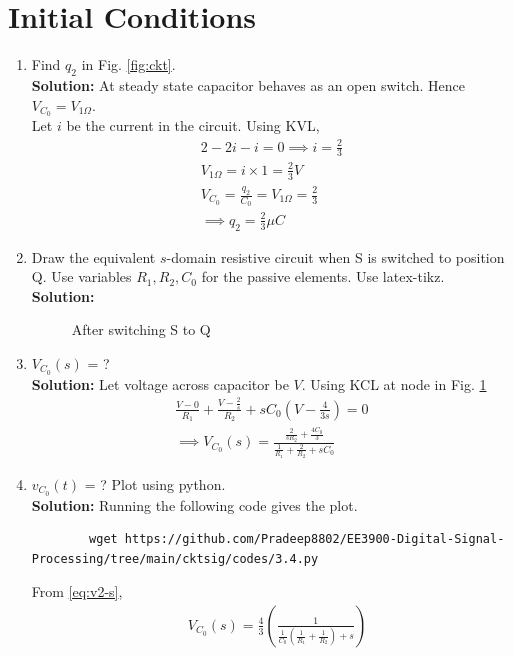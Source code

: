 \documentclass[journal,12pt,twocolumn]{IEEEtran}
\newcommand{\solution}{\noindent \textbf{Solution: }}
\providecommand{\brak}[1]{\ensuremath{\left(#1\right)}}
\numberwithin{equation}{section}
\renewcommand\thesection{\arabic{section}}
\begin{document}
 \section{Initial Conditions}
\begin{enumerate}[label=\arabic*.,ref=\thesection.\theenumi]
\item Find $q_2$ in Fig. \ref{fig:ckt}.\\
			\solution At steady state capacitor behaves as an open switch. Hence $V_{C_0}=V_{1 \Omega}$.\\
			Let $i$ be the current in the circuit. Using KVL,
			\begin{align}
				2-2i-i=0 \implies i=\frac{2}{3}\\
				V_{1 \Omega}=i \times 1= \frac{2}{3} V\\
			V_{C_0}=\frac{q_2}{C_0}=V_{1 \Omega}=\frac{2}{3}\\
			\implies q_2=\frac{2}{3} \mu C
			\end{align}
\item Draw the equivalent $s$-domain resistive circuit when S is switched to position Q.  Use variables $R_1, R_2, C_0$ for the passive elements.
Use latex-tikz.
		\label{prob:init}
		\\\solution 
	\begin{figure}[!ht]
 \centering

\caption{After switching S to Q}
\label{fig:sq}
\end{figure}
		\item $V_{C_0}(s)$ = ? \\
		\solution Let voltage across capacitor be $V$. Using KCL at node in Fig. \ref{fig:sq}
\begin{align}
    \frac{V - 0}{R_1} + \frac{V - \frac{2}{s}}{R_2} + sC_0\brak{V - \frac{4}{3s}} = 0 \\
\implies V_{C_0}(s) = \frac{\frac{2}{sR_2} + \frac{4C_0}{3}}{\frac{1}{R_1} + \frac{2}{R_2} + sC_0}
\label{eq:v2-s}
\end{align} 
	\item $v_{C_0}(t)$ = ? Plot using python.\\
	\solution Running the following code gives the plot.
	\begin{lstlisting}
		wget https://github.com/Pradeep8802/EE3900-Digital-Signal-Processing/tree/main/cktsig/codes/3.4.py
	\end{lstlisting}
	From \eqref{eq:v2-s},
\begin{align}
    &V_{C_0}(s) = \frac{4}{3}\brak{\frac{1}{\frac{1}{C_0}\brak{\frac{1}{R_1} + \frac{1}{R_2}}+s}} \nonumber \\

\end{align}
\end{enumerate}
\end{document}
